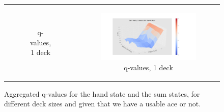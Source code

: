 \begin{figure}[htp]
\begin{tabular}{cc}
\begin{subfigure}[b]{0.48\textwidth}
   \caption{q-values, 1 deck \label{sfig:3Dnd3}}
\end{subfigure}
&
\begin{subfigure}[b]{0.48\textwidth}
  	 \includegraphics[width=\textwidth]{./figures/noace_3D_sum_1_decks.png}
   \caption{q-values, 1 deck \label{sfig:3Dnd4}}
\end{subfigure}
\end{tabular}
\caption{Aggregated q-values for the hand state and the sum states, for different deck sizes and given that we have a 
         usable ace or not.} \label{fig:3Dq-vals}
\end{figure}